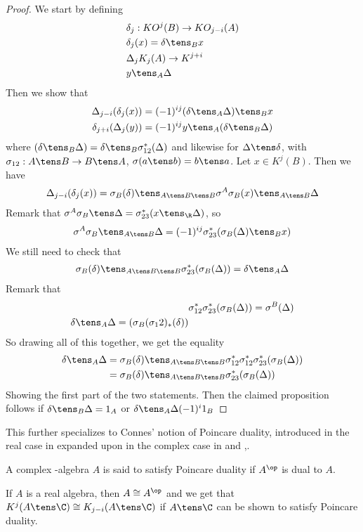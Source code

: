 \begin{proof}
	We start by defining
	\begin{align*}
		&\delta_j:KO^j(B)\to KO_{j-i}(A) \\
		&\delta_j(x)=\delta\tens_B x \\
		&\Delta_j K_j(A)\to K^{j+i} \\
		&y\tens_A \Delta
	\end{align*}
	Then we show that
	\begin{align*}
		\Delta_{j-i}(\delta_j(x))&=(-1)^{ij}(\delta \tens_A \Delta)\tens_B x \\
		\delta_{j+i}(\Delta_j(y))&=(-1)^{ij} y \tens_A (\delta\tens_B \Delta)
	\end{align*}
	where $(\delta \tens_B \Delta)=\delta\tens_B \sigma^{*}_{12}(\Delta)$ and likewise for $\Delta \tens \delta$, with $\sigma_{12}:A\tens B\to B\tens A$, $\sigma(a\tens b)=b\tens a$. 
	Let $x\in K^{j}(B)$. Then we have 
	\begin{align*}
		\Delta_{j-i}(\delta_j(x))=\sigma_B(\delta)\tens_{A\tens B \tens B} \sigma^A\sigma_B(x) \tens_{A\tens B} \Delta 
	\end{align*}
	Remark that $\sigma^A\sigma_B \tens \Delta =\sigma_{23}^*(x\tens_\R \Delta)$, so 
	\begin{align*}
		\sigma^A\sigma_B\tens_{A\tens B} \Delta=(-1)^{ij}\sigma^*_{23}(\sigma_B(\Delta)\tens_B x)
	\end{align*}
	We still need to check that 
	\begin{align*}
		\sigma_B(\delta)\tens_{A\tens B \tens B} \sigma^*_{23}(\sigma_B(\Delta))=\delta \tens_A \Delta
	\end{align*}
	Remark that 
	\begin{align*}
		&\sigma_{12}^*\sigma_{23}^*(\sigma_B(\Delta))=\sigma^B(\Delta) \\
		\delta\tens_A \Delta =(\sigma_B(\sigma_12)_*(\delta))
	\end{align*}
	So drawing all of this together, we get the equality
	\begin{align*}
		\delta\tens_A \Delta &=\sigma_B(\delta)\tens_{A\tens B \tens B} \sigma^*_{12}\sigma^*_{12}\sigma_{23}^*(\sigma_B(\Delta)) \\
		&=\sigma_B(\delta)\tens_{A\tens B \tens B} \sigma_{23}^*(\sigma_B(\Delta))
	\end{align*}
	Showing the first part of the two statements. Then the claimed proposition follows if $\delta\tens_B \Delta=1_A$ or $\delta \tens_A \Delta  (-1)^{i} 1_B$
\end{proof}
This further specializes to Connes' notion of Poincare duality, introduced in the real case in \cite[P.601]{bookbig} expanded upon in the complex case in \cite{rennie2} and \cite{connes1},\cite{connes2}. 
\begin{definition}
	A complex \Cstar-algebra $A$ is said to satisfy Poincare duality if $A^{\op}$ is dual to $A$.  
\end{definition}
If $A$ is a real algebra, then $A\cong A^{\op}$ and we get that $K^{j}(A\tens \C)\cong K_{j-i}(A\tens \C)$ if $A\tens \C$ can be shown to satisfy Poincare duality. 

